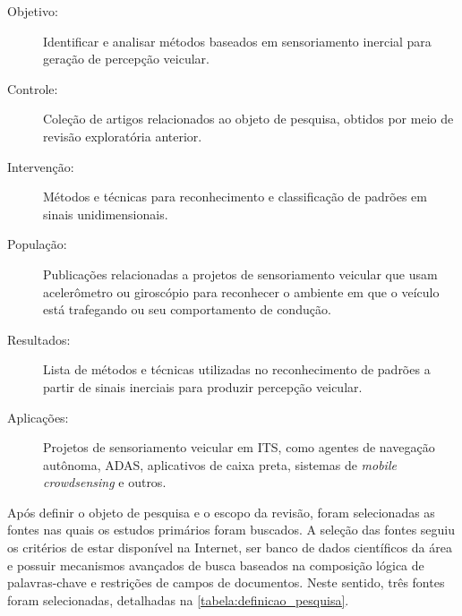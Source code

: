 \begin{description}
\item[Objetivo:] Identificar e analisar métodos baseados em sensoriamento inercial para geração de percepção veicular.
\item[Controle:] Coleção de artigos relacionados ao objeto de pesquisa, obtidos por meio de revisão exploratória anterior.
\item[Intervenção:] Métodos e técnicas para reconhecimento e classificação de padrões em sinais unidimensionais.
\item[População:]Publicações relacionadas a projetos de sensoriamento veicular que usam acelerômetro ou giroscópio para reconhecer o ambiente em que o veículo está trafegando ou seu comportamento de condução.
\item[Resultados:] Lista de métodos e técnicas utilizadas no reconhecimento de padrões a partir de sinais inerciais para produzir percepção veicular.
\item[Aplicações:] Projetos de sensoriamento veicular em ITS, como agentes de navegação autônoma, ADAS, aplicativos de caixa preta, sistemas de \textit{mobile crowdsensing} e outros.
\end{description}

Após definir o objeto de pesquisa e o escopo da revisão, foram selecionadas as fontes nas quais os estudos primários foram buscados. A seleção das fontes seguiu os critérios de estar disponível na Internet, ser banco de dados científicos da área e possuir mecanismos avançados de busca baseados na composição lógica de palavras-chave e restrições de campos de documentos. Neste sentido, três fontes foram selecionadas, detalhadas na \autoref{tabela:definicao_pesquisa}. 

